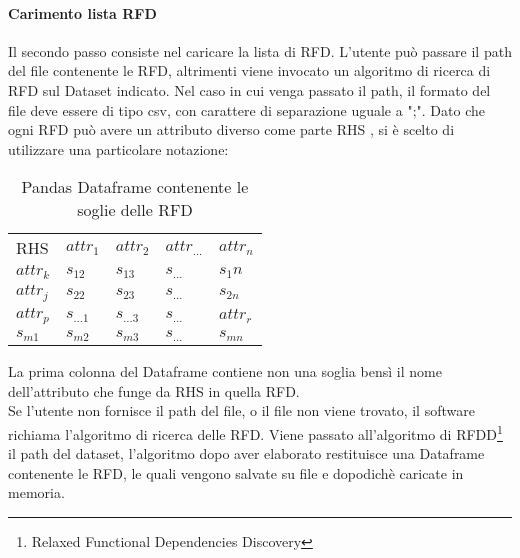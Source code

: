 \paragraph{Carimento lista RFD}
Il secondo passo consiste nel caricare la lista di RFD. L'utente può passare il path del file contenente le RFD, altrimenti viene invocato un algoritmo di ricerca di RFD sul Dataset indicato.
Nel caso in cui venga passato il path, il formato del file deve essere di tipo csv, con carattere di separazione uguale a ";".
Dato che ogni RFD può avere un attributo diverso come parte RHS , si è scelto di utilizzare una particolare notazione:
\begin{table}[h]
    \centering
    \begin{tabular}{l l l l l }
     RHS & $attr_1$ & $attr_2$ & $attr_{\ldots}$ & $attr_n$ \\
    $attr_{k}$ & $s_{12}$ & $s_{13}$ & $s_{\ldots}$ & $s_1n$  \\
    $attr_{j}$ & $s_{22}$ & $s_{23}$  & $s_{\ldots}$ & $s_{2n}$\\
    $attr_{p}$ & $s_{\ldots1}$ & $s_{\ldots3}$  & $s_{\ldots}$ & $attr_{r}$\\
    $s_{m1}$ & $s_{m2}$ & $s_{m3}$ & $s_{\ldots}$ & $s_{mn}$\\
    \end{tabular}
    \caption{Pandas Dataframe contenente le soglie delle RFD}
    \label{tab:abc}
\end{table}

La prima colonna del Dataframe contiene non una soglia bensì il nome dell'attributo che funge da RHS in quella RFD.
\\
Se l'utente non fornisce il path del file, o il file non viene trovato, il software richiama l'algoritmo di ricerca delle RFD. Viene passato all'algoritmo di RFDD\footnote{Relaxed Functional Dependencies Discovery} il path del dataset, l'algoritmo dopo aver elaborato restituisce una Dataframe contenente le RFD, le quali vengono salvate su file e dopodichè caricate in memoria.
